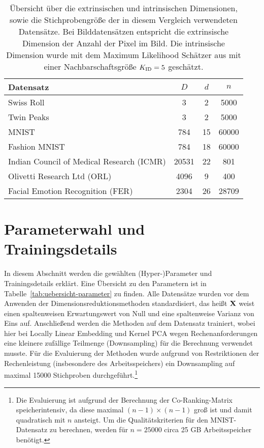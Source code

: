 \begin{table}[ht]
	\centering
	\begin{tabular}{@{}lS[table-format=5.0]S[table-format=2.0]S[table-format=5.0]@{}}
		\toprule
		Datensatz                                 & {$D$} & {$d$} & {$n$} \\ \midrule
		Swiss Roll                                & 3     & 2     & 5000  \\
		Twin Peaks                                & 3     & 2     & 5000  \\
		MNIST                                     & 784   & 15    & 60000 \\
		Fashion MNIST                             & 784   & 18    & 60000 \\
		Indian Council of Medical Research (ICMR) & 20531 & 22    & 801   \\
		Olivetti Research Ltd (ORL)               & 4096  & 9     & 400   \\
		Facial Emotion Recognition (FER)          & 2304  & 26    & 28709 \\
		\bottomrule
	\end{tabular}
	\caption[Übersicht über die extrinsischen und intrinsischen Dimensionen, sowie die Stichprobengrößen der in diesem Vergleich verwendeten Datensätze]{Übersicht über die extrinsischen und intrinsischen Dimensionen, sowie die Stichprobengröße der in diesem Vergleich verwendeten Datensätze. Bei Bilddatensätzen entspricht die extrinsische Dimension der Anzahl der Pixel im Bild. Die intrinsische Dimension wurde mit dem Maximum Likelihood Schätzer aus  mit einer Nachbarschaftsgröße $K_{\text{ID}} = 5$ geschätzt.}
	\label{tab:uebersicht-datensaetze}
\end{table}

\section{Parameterwahl und Trainingsdetails}
\label{ch:Vergleich:sec:ParameterwahlTrainingsdetails}

In diesem Abschnitt werden die gewählten (Hyper-)Parameter und Trainingsdetails erklärt. Eine
Übersicht zu den Parametern ist in Tabelle~\ref{tab:uebersicht-parameter} zu finden. Alle
Datensätze wurden vor dem Anwenden der Dimensionsreduktionsmethoden standardisiert, das heißt
$\mathbf{X}$ weist einen spaltenweisen Erwartungswert von Null und eine spaltenweise Varianz von Eins
auf. Anschließend werden die Methoden auf dem Datensatz trainiert, wobei hier bei Locally Linear
Embedding und Kernel PCA wegen Rechenanforderungen eine kleinere zufällige Teilmenge (Downsampling)
für die Berechnung verwendet musste. Für die Evaluierung der Methoden wurde aufgrund von
Restriktionen der Rechenleistung (insbesondere des Arbeitsspeichers) ein Downsampling auf maximal
\num{15000} Stichproben durchgeführt.\footnote{Die Evaluierung ist aufgrund der Berechnung der
	Co-Ranking-Matrix speicherintensiv, da diese maximal $(n-1) \times (n-1)$ groß ist und damit
	quadratisch mit $n$ ansteigt. Um die Qualitätskriterien für den MNIST-Datensatz zu berechnen,
	werden für $n=\num{25000}$ circa 25 GB Arbeitsspeicher benötigt.}

